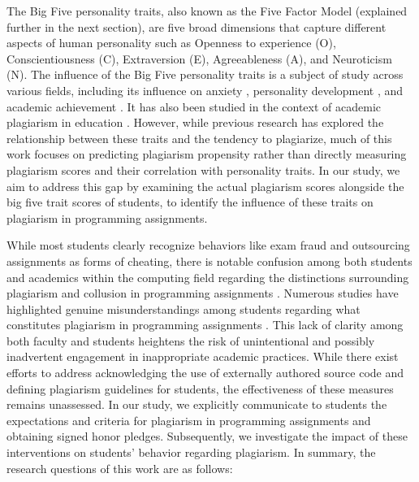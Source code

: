 The Big Five personality traits, also known as the Five Factor Model (explained further in the next section), are five broad dimensions that capture different aspects of human personality such as Openness to experience (O), Conscientiousness (C), Extraversion (E), Agreeableness (A), and Neuroticism (N). The influence of the Big Five personality traits is a subject of study across various fields, including its influence on anxiety \cite{AnxityBigfive}, personality development \cite{Tetzner}, and academic achievement \cite{AchievementBigfive, https://doi.org/10.1111/jopy.12663, OZ2015PER}. It has also been studied in the context of academic plagiarism in education \cite{Giluk2015BigFP, Bhutto2019ACS}. However, while previous research has explored the relationship between these traits and the tendency to plagiarize, much of this work focuses on predicting plagiarism propensity rather than directly measuring plagiarism scores and their correlation with personality traits. In our study, we aim to address this gap by examining the actual plagiarism scores alongside the big five trait scores of students, to identify the influence of these traits on plagiarism in programming assignments.

While most students clearly recognize behaviors like exam fraud and outsourcing assignments as forms of cheating, there is notable confusion among both students and academics within the computing field regarding the distinctions surrounding plagiarism and collusion in programming assignments \cite{SCPlagiarism}. Numerous studies have highlighted genuine misunderstandings among students regarding what constitutes plagiarism in programming assignments \cite{SCPlagiarism, Cosma2008TowardsAD, 10.1145/637610.544468, 10.1145/2526968.2526971}. This lack of clarity among both faculty and students heightens the risk of unintentional and possibly inadvertent engagement in inappropriate academic practices. While there exist efforts to address acknowledging the use of externally authored source code and defining plagiarism guidelines for students, the effectiveness of these measures remains unassessed. In our study, we explicitly communicate to students the expectations and criteria for plagiarism in programming assignments and obtaining signed honor pledges. Subsequently, we investigate the impact of these interventions on students' behavior regarding plagiarism. In summary, the research questions of this work are as follows:

